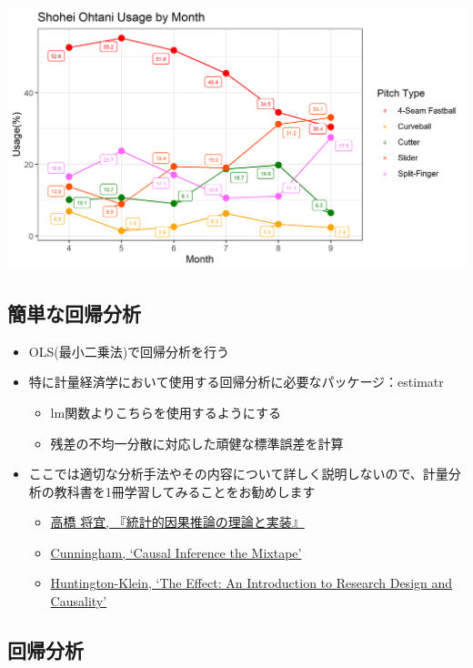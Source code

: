 \documentclass[
]{ltjsarticle}
\providecommand{\tightlist}{%
  \setlength{\itemsep}{0pt}\setlength{\parskip}{0pt}}
\begin{document}
\begin{center}\includegraphics[width=0.65\linewidth]{figs/Ohtani_pitch_usage_byMonth} \end{center}

\hypertarget{ux7c21ux5358ux306aux56deux5e30ux5206ux6790}{%
\subsection{簡単な回帰分析}\label{ux7c21ux5358ux306aux56deux5e30ux5206ux6790}}

\begin{itemize}
\tightlist
\item
  OLS(最小二乗法)で回帰分析を行う
\item
  特に計量経済学において使用する回帰分析に必要なパッケージ：estimatr

  \begin{itemize}
  \tightlist
  \item
    lm関数よりこちらを使用するようにする
  \item
    残差の不均一分散に対応した頑健な標準誤差を計算
  \end{itemize}
\item
  ここでは適切な分析手法やその内容について詳しく説明しないので、計量分析の教科書を1冊学習してみることをお勧めします

  \begin{itemize}
  \tightlist
  \item
    \href{https://www.kyoritsu-pub.co.jp/bookdetail/9784320112452}{高橋
    将宜, 『統計的因果推論の理論と実装』}
  \item
    \href{https://mixtape.scunning.com/}{Cunningham, `Causal Inference
    the Mixtape'}
  \item
    \href{https://theeffectbook.net/}{Huntington-Klein, `The Effect: An
    Introduction to Research Design and Causality'}
  \end{itemize}
\end{itemize}

\hypertarget{ux56deux5e30ux5206ux6790}{%
\subsection{回帰分析}\label{ux56deux5e30ux5206ux6790}}
\end{document}
